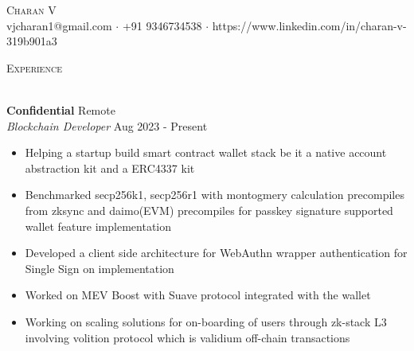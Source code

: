\documentclass[a4paper]{article}
\newcommand{\lineunder} {
    \vspace*{-8pt} \\
    \hspace*{-18pt} \hrulefill \\
}
\newcommand{\header} [1] {
    {\hspace*{-18pt}\vspace*{6pt} \textsc{#1}}
    \vspace*{-6pt} \lineunder
}
\begin{document}
\vspace*{-40pt}

    

\vspace*{-10pt}
\begin{center}
	{\Huge \scshape {Charan V}}\\
	vjcharan1@gmail.com $\cdot$ +91 9346734538 $\cdot$ https://www.linkedin.com/in/charan-v-319b901a3\\
\end{center}



\header{Experience}
\vspace{1mm}

\textbf{Confidential} \hfill Remote\\
\textit{Blockchain Developer} \hfill Aug 2023 - Present\\
\vspace{-1mm}
\begin{itemize} \itemsep 1pt
	\item Helping a startup build smart contract wallet stack be it a native account abstraction kit and a ERC4337 kit
    \item Benchmarked secp256k1, secp256r1 with montogmery calculation precompiles from zksync and daimo(EVM) precompiles for passkey signature supported wallet feature implementation
    \item Developed a client side architecture for WebAuthn wrapper authentication for Single Sign on implementation
    \item Worked on MEV Boost with Suave protocol integrated with the wallet
    \item Working on scaling solutions for on-boarding of users through zk-stack L3 involving volition protocol which is validium off-chain transactions
\end{itemize}
\end{document}
